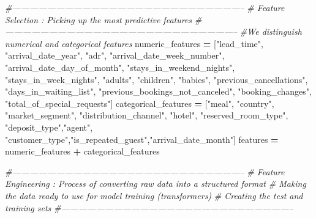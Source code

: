 \documentclass[10pt,a4paper]{article}
\newenvironment{Shaded}{\begin{snugshade}}{\end{snugshade}}
\newcommand{\CommentTok}[1]{\textcolor[rgb]{0.56,0.35,0.01}{\textit{#1}}}
\newcommand{\NormalTok}[1]{#1}
\newcommand{\OperatorTok}[1]{\textcolor[rgb]{0.81,0.36,0.00}{\textbf{#1}}}
\newcommand{\StringTok}[1]{\textcolor[rgb]{0.31,0.60,0.02}{#1}}
\theoremstyle{break}
\begin{document}
\begin{Shaded}
\begin{Highlighting}[]
\CommentTok{#--------------------------------------------------------------------------------}
\CommentTok{# Feature Selection : Picking up the most predictive features }
\CommentTok{#--------------------------------------------------------------------------------}
\CommentTok{#We distinguish numerical and categorical features}
\NormalTok{numeric_features }\OperatorTok{=}\NormalTok{ [}\StringTok{"lead_time"}\NormalTok{, }\StringTok{"arrival_date_year"}\NormalTok{,}
                    \StringTok{"adr"}\NormalTok{,}
                    \StringTok{"arrival_date_week_number"}\NormalTok{,}
                    \StringTok{"arrival_date_day_of_month"}\NormalTok{, }\StringTok{"stays_in_weekend_nights"}\NormalTok{, }\StringTok{"stays_in_week_nights"}\NormalTok{, }
                    \StringTok{"adults"}\NormalTok{, }\StringTok{"children"}\NormalTok{,}
                    \StringTok{"babies"}\NormalTok{, }\StringTok{"previous_cancellations"}\NormalTok{, }
                    \StringTok{"days_in_waiting_list"}\NormalTok{, }\StringTok{"previous_bookings_not_canceled"}\NormalTok{, }\StringTok{"booking_changes"}\NormalTok{, }
                    \StringTok{"total_of_special_requests"}\NormalTok{]}
\NormalTok{categorical_features }\OperatorTok{=}\NormalTok{ [}\StringTok{"meal"}\NormalTok{, }\StringTok{"country"}\NormalTok{, }\StringTok{"market_segment"}\NormalTok{, }\StringTok{"distribution_channel"}\NormalTok{,}
                        \StringTok{"hotel"}\NormalTok{, }\StringTok{"reserved_room_type"}\NormalTok{, }\StringTok{"deposit_type"}\NormalTok{,}\StringTok{"agent"}\NormalTok{, }
                       \StringTok{"customer_type"}\NormalTok{,}\StringTok{"is_repeated_guest"}\NormalTok{,}\StringTok{"arrival_date_month"}\NormalTok{]                        }
\NormalTok{features }\OperatorTok{=}\NormalTok{ numeric_features }\OperatorTok{+}\NormalTok{ categorical_features}

\CommentTok{#--------------------------------------------------------------------------------}
\CommentTok{# Feature Engineering : Process of converting raw data into a structured format }
\CommentTok{# Making the data ready to use for model training (transformers)}
\CommentTok{# Creating the test and training sets}
\CommentTok{#--------------------------------------------------------------------------------}


\end{Highlighting}
\end{Shaded}
\end{document}
